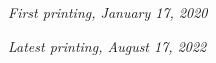 \documentclass[11pt,fleqn]{book} %
\begin{document}
\begin{sloppypar}
\vspace{0.5cm}
\noindent
\textit{First printing, January 17, 2020}

\vspace{0.5cm}
\noindent
\textit{Latest printing, August 17, 2022}
% 
\newpage

\pagestyle{empty} %
\tableofcontents %
\cleardoublepage %
\pagestyle{fancy} %
%
%
%
%
%
%
%
%
%
%
%
%
%

%
%
%
%

\end{sloppypar}
\end{document}
